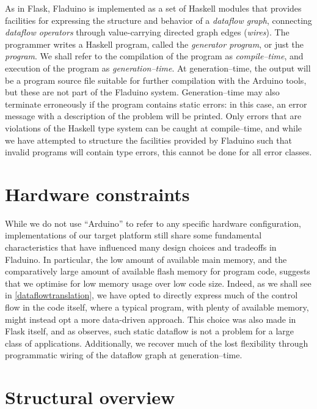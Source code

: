 \documentclass[a4paper, oneside, final]{memoir}
\begin{document}
As in Flask, Fladuino is implemented as a set of Haskell modules that
provides facilities for expressing the structure and behavior of a
\textit{dataflow graph}, connecting \textit{dataflow operators}
through value-carrying directed graph edges (\textit{wires}).  The
programmer writes a Haskell program, called the \textit{generator
  program}, or just the \textit{program}.  We shall refer to the
compilation of the program as \textit{compile--time}, and execution of
the program as \textit{generation--time}.  At generation--time, the
output will be a program source file suitable for further compilation
with the Arduino tools, but these are not part of the Fladuino system.
Generation--time may also terminate erroneously if the program
contains static errors: in this case, an error message with a
description of the problem will be printed.  Only errors that are
violations of the Haskell type system can be caught at compile--time,
and while we have attempted to structure the facilities provided by
Fladuino such that invalid programs will contain type errors, this
cannot be done for all error classes.


\section{Hardware constraints}

While we do not use ``Arduino'' to refer to any specific hardware
configuration, implementations of our target platform still share some
fundamental characteristics that have influenced many design choices
and tradeoffs in Fladuino.  In particular, the low amount of available
main memory, and the comparatively large amount of available flash
memory for program code, suggests that we optimise for low memory
usage over low code size.  Indeed, as we shall see in
\ref{dataflowtranslation}, we have opted to directly express much of
the control flow in the code itself, where a typical program, with
plenty of available memory, might instead opt a more data-driven
approach.  This choice was also made in Flask itself, and as
\cite{flask08} observes, such static dataflow is not a problem for a
large class of applications.  Additionally, we recover much of the
lost flexibility through programmatic wiring of the dataflow graph at
generation--time.

\section{Structural overview}
\end{document}
